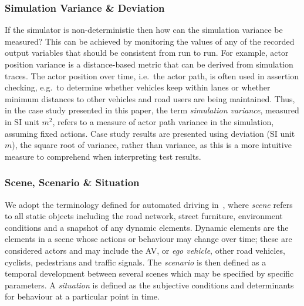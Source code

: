 \documentclass[letterpaper, 10 pt, journal, twoside]{IEEEtran}
\begin{document}
\subsubsection{Simulation Variance \& Deviation}
If the simulator is non-deterministic then how can the simulation variance be measured? This can be achieved by monitoring the values of any of the recorded output variables that should be consistent from run to run. 
For example, actor position variance is a distance-based metric that can be derived from simulation traces. The actor position over time, i.e.\ the actor path, is often used in assertion checking, e.g.\ to determine whether vehicles keep within lanes or whether minimum distances to other vehicles and road users are being maintained. 
% 
Thus, in the case study presented in this paper, the term \textit{simulation variance}, measured in SI unit $m^2$, refers to a measure of actor path variance in the simulation, assuming fixed actions. 
%
%
Case study results are presented using deviation (SI unit $m$), the square root of variance, rather than variance, as this is a more intuitive measure to comprehend when interpreting test results.
%
\\

\subsubsection{Scene, Scenario \& Situation}
We adopt the terminology defined for automated driving in~\cite{Ulbrich2015}, where \textit{scene} refers to all static objects including the road network, street furniture, environment conditions and a snapshot of any dynamic elements. Dynamic elements are the elements in a scene whose actions or behaviour may change over time; these are considered actors and may include the AV, or \textit{ego vehicle}, other road vehicles, cyclists, pedestrians and traffic signals. The \textit{scenario} is then defined as a temporal development between several scenes which may be specified by specific parameters. A \textit{situation} is defined as the subjective conditions and determinants for behaviour at a particular point in time.
\end{document}
